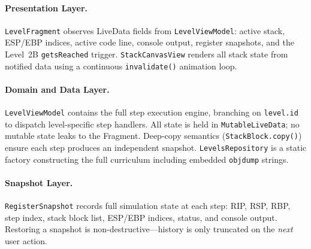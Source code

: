 \documentclass[12pt,a4paper]{article}
\begin{document}
\paragraph{Presentation Layer.}
\texttt{LevelFragment} observes LiveData fields from \texttt{LevelViewModel}:
active stack, ESP/EBP indices, active code line, console output, register snapshots,
and the Level~2B \texttt{getsReached} trigger. \texttt{StackCanvasView} renders all
stack state from notified data using a continuous \texttt{invalidate()} animation loop.

\paragraph{Domain and Data Layer.}
\texttt{LevelViewModel} contains the full step execution engine, branching on
\texttt{level.id} to dispatch level-specific step handlers. All state is held in
\texttt{MutableLiveData}; no mutable state leaks to the Fragment. Deep-copy
semantics (\texttt{StackBlock.copy()}) ensure each step produces an independent
snapshot. \texttt{LevelsRepository} is a static factory constructing the full
curriculum including embedded \texttt{objdump} strings.

\paragraph{Snapshot Layer.}
\texttt{RegisterSnapshot} records full simulation state at each step: RIP, RSP,
RBP, step index, stack block list, ESP/EBP indices, status, and console output.
Restoring a snapshot is non-destructive---history is only truncated on the
\textit{next} user action.
\end{document}
